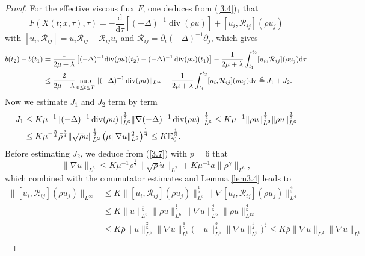 \documentclass[10pt,a4paper]{amsart}
\DeclareMathOperator{\divv}{div}
\begin{document}
\begin{proof}
For the effective viscous flux $F$, one deduces from (\ref{3.4})$_1$ that
$$
F \left(X (t;x,\tau),\tau \right) = - \frac{\mathrm{d}}{\mathrm{d}
\tau} \left[(- \Delta)^{-1} \divv (\rho u) \right] + [u_i,\mathcal{R}_{ij} ] (\rho u_j)
$$
with $[u_i, \mathcal{R}_{ij}] = u_i \mathcal{R}_{ij} - \mathcal{R}_{ij} u_i$ and $\mathcal{R}_{ij} = \partial_i \left(- \Delta\right)^{-1} \partial_j$, which gives
\begin{align}
b(t_2) - b(t_1)
& = \frac{1}{2 \mu + \lambda } \left[(- \Delta)^{-1} \mathrm{div} (\rho u) (t_2) - (- \Delta)^{-1} \divv (\rho u) (t_1) \right] - \frac{1}{2 \mu + \lambda } \int^{t_2}_{t_1} [u_i,\mathcal{R}_{ij} ] (\rho u_j) \mathrm{d} \tau \notag\\
& \leq \frac{2}{2 \mu + \lambda } \sup_{0 \leq t \leq T} \| (- \Delta)^{-1} \divv (\rho u)\|_{L^{\infty }} - \frac{1}{2 \mu + \lambda } \int^{t_2}_{t_1} [u_i,\mathcal{R}_{ij} ] (\rho u_j) \mathrm{d} \tau \triangleq J_1 + J_2.\label{4.8}
\end{align}
Now we estimate $J_1$ and $J_2$ term by term
\begin{align}\label{4.9}
J_1
& \leq K \mu^{-1} \|(-\Delta)^{-1} \divv (\rho u)\|_{L^6}^{\frac{1}{2}} \|\nabla (-\Delta)^{-1} \divv (\rho u)\|_{L^6}^{\frac{1}{2}} \leq K \mu^{-1} \|\rho u\|_{L^2}^{\frac{1}{2}} \|\rho u\|_{L^6}^{\frac{1}{2}}\notag \\
& \leq K \mu^{- \frac{5}{4}} \bar{\rho}^{\frac{3}{4}} \|\sqrt \rho u\|_{L^2}^{\frac{1}{2}} \left( \mu \|\nabla u\|_{L^2}^2 \right)^{\frac{1}{4}} \leq K \mathbb{E}_0^{\frac{1}{8}}.
\end{align}
Before estimating $J_2$, we deduce from (\ref{3.7}) with $p = 6$ that
$$
\|\nabla u\|_{L^6}
\leq K \mu^{-1} \bar{\rho}^{\frac{1}{2}} \|\sqrt{\rho} \dot{u}\|_{L^2} + K \mu^{-1} a \|\rho^{\gamma}\|_{L^6},
$$
which combined with  the commutator estimates and Lemma \ref{lem3.4} leads to
$$
\begin{aligned}
\|[u_i,\mathcal{R}_{ij} ] (\rho u_j)\|_{L^\infty }
& \leq K \|[u_i,\mathcal{R}_{ij} ] (\rho u_j)\|_{L^3}^{\frac{1}{5}} \|\nabla [u_i,\mathcal{R}_{ij} ] (\rho u_j)\|_{L^4}^{\frac{4}{5}}\\
& \leq K \|u\|_{L^6}^{\frac{1}{5}} \|\rho u\|_{L^6}^{\frac{1}{5}} \|\nabla u\|_{L^6}^{\frac{4}{5}} \|\rho u\|_{L^{12}}^{\frac{4}{5}}\\
& \leq K \bar{\rho} \|u\|_{L^6}^{\frac{2}{5}} \|\nabla u\|_{L^6}^{\frac{4}{5}} \Big( \|u\|_{L^6}^{\frac{3}{4}} \|\nabla u\|_{L^6}^{\frac{1}{4}}\Big)^{\frac{4}{5}} \leq K \bar{\rho} \|\nabla u\|_{L^2} \|\nabla u\|_{L^6}\\

\end{aligned}$$
\end{proof}
\end{document}
